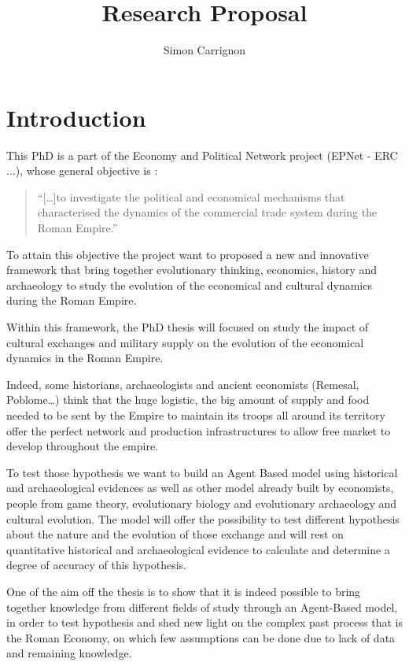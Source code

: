 \documentclass[a4paper]{article}
\title{Research Proposal}
\author{Simon Carrignon}
\begin{document}
\section{Introduction}

This PhD is a part of the Economy and Political Network project (EPNet - ERC ...), whose general objective is :
\begin{quote}
	``[\ldots]to investigate the political and economical mechanisms that characterised the dynamics of the commercial trade system during the Roman Empire.''
\end{quote}
To attain this objective the project want to proposed a new and innovative framework that bring together evolutionary thinking, economics, history and archaeology to study the evolution of the economical and cultural dynamics during the Roman Empire. 

Within this framework, the PhD thesis will focused on study the impact of cultural exchanges and military supply on the evolution of the economical dynamics in the Roman Empire.

Indeed, some historians, archaeologists and ancient economists (Remesal, Poblome\ldots) think that the huge logistic, the big amount of supply and food needed to be sent by the Empire to maintain its troops all around its territory offer the perfect network and production infrastructures to allow free market to develop throughout the empire.  

To test those hypothesis we want to build an Agent Based model using historical and archaeological evidences as well as other model already built by economists, people from game theory, evolutionary biology and evolutionary archaeology and cultural evolution. The model will offer the possibility to test different hypothesis about the nature and the evolution of those exchange and will rest on quantitative historical and archaeological evidence to calculate and determine a degree of accuracy of this hypothesis.
 
One of the aim off the thesis is to show that it is indeed  possible to bring together knowledge from different fields of study through an Agent-Based model, in order to test hypothesis and shed new light on the complex past process that is the Roman Economy, on which few assumptions can be done due to lack of data and remaining knowledge.

\end{document}
